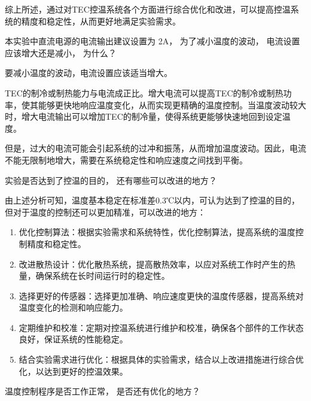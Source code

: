 \documentclass[dvipsnames, svgnames,a4paper,11pt]{article}
\begin{document}
    综上所述，通过对TEC控温系统各个方面进行综合优化和改进，可以提高控温系统的精度和稳定性，从而更好地满足实验需求。
    


    \begin{question}
        本实验中直流电源的电流输出建议设置为 2A， 为了减小温度的波动， 电流设置应该增大还是减小， 为什么？
    \end{question}

    要减小温度的波动，电流设置应该适当增大。
    
    TEC的制冷或制热能力与电流成正比。增大电流可以提高TEC的制冷或制热功率，使其能够更快地响应温度变化，从而实现更精确的温度控制。当温度波动较大时，增大电流输出可以增加TEC的制冷量，使得系统更能够快速地回到设定温度。

    但是，过大的电流可能会引起系统的过冲和振荡，从而增加温度波动。因此，电流不能无限制地增大，需要在系统稳定性和响应速度之间找到平衡。
    



    \begin{question}
        实验是否达到了控温的目的， 还有哪些可以改进的地方？
    \end{question}

        由上述分析可知，温度基本稳定在标准差0.3℃以内，可认为达到了控温的目的，但对于温度的控制还可以更加精准，可以改进的地方：

        \begin{enumerate}
            \item 优化控制算法：根据实验需求和系统特性，优化控制算法，提高系统的温度控制精度和稳定性。
            \item 改进散热设计：优化散热系统，提高散热效率，以应对系统工作时产生的热量，确保系统在长时间运行时的稳定性。
            \item 选择更好的传感器：选择更加准确、响应速度更快的温度传感器，提高系统对温度变化的检测和响应能力。
            \item 定期维护和校准：定期对控温系统进行维护和校准，确保各个部件的工作状态良好，保证系统的性能稳定。
            \item 结合实验需求进行优化：根据具体的实验需求，结合以上改进措施进行综合优化，以达到更好的控温效果。
        \end{enumerate}






    \begin{question}
        温度控制程序是否工作正常， 是否还有优化的地方？
    \end{question}
\end{document}
